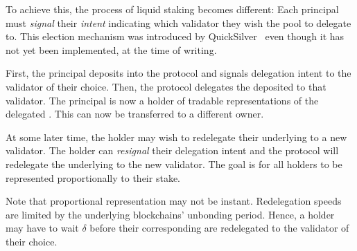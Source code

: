 To achieve this, the process of liquid
staking becomes different: Each principal must \emph{signal} their
\emph{intent} indicating which validator they wish
the pool to delegate to. This election mechanism was introduced by
QuickSilver~\cite{quicksilver} even though it has not yet been implemented,
at the time of writing.

First, the principal deposits \asset into the protocol and signals
delegation intent to the validator of their choice. Then, the protocol
delegates the deposited \asset to that validator. The principal is
now a holder of tradable \stasset representations of the delegated \asset.
This \stasset can now be transferred to a different owner.

At some later time, the \stasset holder may wish to redelegate
their underlying \asset to a new validator.
The \stasset holder can \emph{resignal} their delegation intent and the protocol
will redelegate the underlying \asset to the new validator.
The goal is for all \stasset holders to be represented proportionally to
their stake.

Note that proportional representation may not be instant. Redelegation speeds
are limited by the underlying blockchains' unbonding period.
Hence, a \stasset holder may have to wait $\delta$ before their corresponding
\assets are redelegated to the validator of their choice.